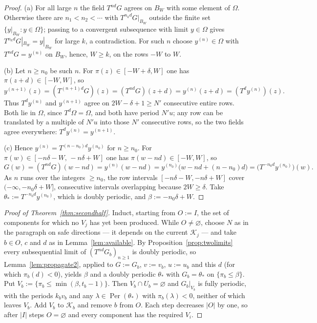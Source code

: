 \documentclass[11pt,reqno]{amsart}
\theoremstyle{plain}
\theoremstyle{definition}
\theoremstyle{remark}
\theoremstyle{plain}
\theoremstyle{remark}
\theoremstyle{definition}
\numberwithin{equation}{section}
\DeclareMathOperator{\Per}{Per}
\newcommand{\cK}{\mathcal{K}}
\begin{document}
\begin{proof}
\textup{(a)} For all large $n$ the field $T^{nd}G$ agrees on $B_W$ with some
element of $\Omega$.  Otherwise there are $n_1<n_2<\cdots$ with
$T^{n_kd}G|_{B_W}$ outside the finite set $\{y|_{B_W}:y\in\Omega\}$; passing to
a convergent subsequence with limit $y\in\Omega$ gives
$T^{n_kd}G|_{B_W}=y|_{B_W}$ for large $k$, a contradiction.  For such $n$ choose
$y^{(n)}\in\Omega$ with $T^{nd}G=y^{(n)}$ on $B_W$, hence, $W\ge k$, on the rows
$-W$ to $W$.

\textup{(b)} Let $n\ge n_0$ be such $n$.  For $\pi(z)\in[-W+\delta,W]$ one has
$\pi(z+d)\in[-W,W]$, so
\[y^{(n+1)}(z)=(T^{(n+1)d}G)(z)=(T^{nd}G)(z+d)=y^{(n)}(z+d)=(T^{d}y^{(n)})(z).\]
Thus $T^dy^{(n)}$ and $y^{(n+1)}$ agree on $2W-\delta+1\ge N'$ consecutive
entire rows.  Both lie in $\Omega$, since $T^d\Omega=\Omega$, and both have
period $N'u$; any row can be translated by a multiple of $N'u$ into those $N'$
consecutive rows, so the two fields agree everywhere: $T^dy^{(n)}=y^{(n+1)}$.

\textup{(c)} Hence $y^{(n)}=T^{(n-n_0)d}y^{(n_0)}$ for $n\ge n_0$.  For
$\pi(w)\in[-n\delta-W,\,-n\delta+W]$ one has $\pi(w-nd)\in[-W,W]$, so
\[G(w)=(T^{nd}G)(w-nd)=y^{(n)}(w-nd)
  =y^{(n_0)}\bigl(w-nd+(n-n_0)d\bigr)=\bigl(T^{-n_0d}y^{(n_0)}\bigr)(w).\]
As $n$ runs over the integers $\ge n_0$, the row intervals
$[-n\delta-W,-n\delta+W]$ cover $(-\infty,-n_0\delta+W]$, consecutive intervals
overlapping because $2W\ge\delta$.  Take $\theta_*:=T^{-n_0d}y^{(n_0)}$, which is
doubly periodic, and $\beta:=-n_0\delta+W$.
\end{proof}

\begin{proof}[Proof of Theorem~\textup{\ref{thm:secondhalf}}]
Induct, starting from $O:=I$, the set of components for which no $V_j$ has yet
been produced.  While $O\ne\varnothing$, choose $N$ as in the paragraph on safe
directions — it depends on the current $\cK_j$ — and take $b\in O$, $c$ and $d$
as in Lemma~\ref{lem:available}.  By Proposition~\ref{prop:twolimits} every
subsequential limit of $(T^{nd}G_b)_{n\ge1}$ is doubly periodic, so
Lemma~\ref{lem:propagate2}, applied to $G:=G_b$, $v:=v_b$, $u:=u_b$ and this $d$
(for which $\pi_b(d)<0$), yields $\beta$ and a doubly periodic $\theta_*$ with
$G_b=\theta_*$ on $\{\pi_b\le\beta\}$.  Put
$V_b:=\{\pi_b\le\min(\beta,t_b-1)\}$.  Then $V_b\cap U_b=\varnothing$ and
$G_b|_{V_b}$ is fully periodic, with the periods $k_bv_b$ and any
$\lambda\in\Per(\theta_*)$ with $\pi_b(\lambda)<0$, neither of which leaves
$V_b$.  Add $V_b$ to $\cK_b$ and remove $b$ from $O$.  Each step decreases
$|O|$ by one, so after $|I|$ steps $O=\varnothing$ and every component has the
required $V_i$.
\end{proof}
\end{document}

